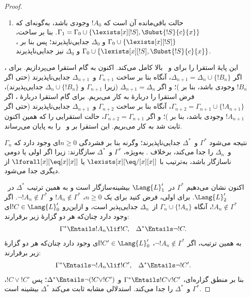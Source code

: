 \documentclass[../../../include/open-logic-section]{subfiles}
\begin{document}
\begin{proof}
\begin{enumerate}
  $\Gamma_1$ و~$\Delta_0$ جدایی‌ناپذیرند.
\item حالت باقی‌مانده آن است که $!A_0$ وجودی باشد، به‌گونه‌ای که
  $\Gamma_1 = \Gamma_0 \cup \{ \lexists[x][!S], \Subst{!S}{c}{x}
  \}$. بنا بر ساخت، $\Gamma_0 \cup \{ \lexists[x][!S]\}$ و
  $\Delta_0$ جدایی‌ناپذیرند؛ پس بنا بر ،
  $\Gamma_0 \cup \{ \lexists[x][!S], \Subst{!S}{c}{x} \}$ و
  $\Delta_0$ نیز جدایی‌ناپذیرند.
\end{enumerate}
این پایهٔ استقرا را برای  و~ بالا کامل
می‌کند. اکنون به گام استقرا می‌پردازیم. برای ، اگر
$\Delta_{n+1} = \Delta_n \cup \{ !B_n \}$، آنگاه بنا بر ساخت
$\Gamma_{n+1}$ و~$\Delta_{n+1}$ جدایی‌ناپذیرند (حتی اگر $!B_n$ وجودی
باشد، بنا بر )؛ و اگر
$\Delta_{n+1} = \Delta_n$ (زیرا $\Gamma_{n+1}$ و
$\Delta_n \cup \{!B_n\}$ جدایی‌پذیرند)، فرض استقرا را دربارهٔ
 به کار می‌بریم. برای گام استقرا دربارهٔ
، اگر
$\Gamma_{n+2} = \Gamma_{n+1} \cup \{!A_{n+1} \}$، آنگاه بنا بر ساخت
$\Gamma_{n+2}$ و~$\Delta_{n+1}$ جدایی‌ناپذیرند (حتی اگر $!A_{n+1}$
وجودی باشد، بنا بر )؛ و اگر
$\Gamma_{n+2} = \Gamma_{n+1}$، حالت استقرایی  را که
همین اکنون ثابت شد به کار می‌بریم. این استقرا بر 
و~ را به پایان می‌رساند.

نتیجه می‌شود $\Gamma^*$ و~$\Delta^*$ جدایی‌ناپذیرند؛ وگرنه بنا بر
فشردگی $n \ge 0$ای وجود دارد که $\Gamma_n$ و~$\Delta_n$ را جدا
می‌کند، برخلاف . به‌ویژه، $\Gamma^*$ و~$\Delta^*$
سازگارند: زیرا اگر اولی یا دومی ناسازگار باشد، به‌ترتیب با
$\lexists[x][\eq/[x][x]]$ یا $\lforall[x][\eq[x][x]]$ از دیگری جدا
می‌شود.

اکنون نشان می‌دهیم $\Gamma^*$ در~$\Lang{L}'_1$ بیشینه‌سازگار است و
به همین ترتیب $\Delta^*$ در~$\Lang{L}'_2$. برای اولی، فرض کنید برای
یک $n \ge 0$، $!A_n \notin \Gamma^*$ و
$\lnot !A_n \notin \Gamma^*$. اگر $!A_n \notin \Gamma^*$، آنگاه
$\Gamma_n \cup \{!A_n \}$ از~$\Delta_n$ جدایی‌پذیر است، و ازاین‌رو
$!C \in \Lang{L}'_0$ای وجود دارد چنان‌که هر دو گزارهٔ زیر برقرارند:
\begin{align*}
  \Gamma^* & \Entails !A_n \lif !C, &
  \Delta^* & \Entails \lnot !C.
\end{align*}
به همین ترتیب، اگر $\lnot !A_n \notin \Gamma^*$،
$!C' \in \Lang{L}'_0$ای وجود دارد چنان‌که هر دو گزارهٔ زیر برقرارند:
\begin{align*}
  \Gamma^* & \Entails \lnot !A_n \lif !C', &
  \Delta^* & \Entails \lnot !C'.
\end{align*}
بنا بر منطق گزاره‌ای، $\Gamma^* \Entails !C \lor !C'$ و
$\Delta^* \Entails \lnot (!C \lor !C')$؛ پس $!C \lor !C'$،
$\Gamma^*$ و~$\Delta^*$ را جدا می‌کند. استدلالی مشابه ثابت می‌کند
$\Delta^*$ بیشینه است.


\end{proof}
\end{document}

